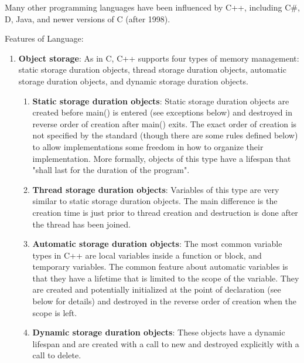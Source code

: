Many other programming languages have been influenced by C++, including C\#, D, Java, and newer versions of C (after 1998).

Features of Language:
\begin{enumerate}
	\item \textbf{Object storage}: As in C, C++ supports four types of memory management: static storage duration objects, thread storage duration objects, automatic storage duration objects, and dynamic storage duration objects.
	\begin{enumerate}
		\item \textbf{Static storage duration objects}: Static storage duration objects are created before main() is entered (see exceptions below) and destroyed in reverse order of creation after main() exits. The exact order of creation is not specified by the standard (though there are some rules defined below) to allow implementations some freedom in how to organize their implementation. More formally, objects of this type have a lifespan that "shall last for the duration of the program".
		\item \textbf{Thread storage duration objects}: Variables of this type are very similar to static storage duration objects. The main difference is the creation time is just prior to thread creation and destruction is done after the thread has been joined.
		\item \textbf{Automatic storage duration objects}: The most common variable types in C++ are local variables inside a function or block, and temporary variables. The common feature about automatic variables is that they have a lifetime that is limited to the scope of the variable. They are created and potentially initialized at the point of declaration (see below for details) and destroyed in the reverse order of creation when the scope is left.
		\item \textbf{Dynamic storage duration objects}: These objects have a dynamic lifespan and are created with a call to new and destroyed explicitly with a call to delete.
	\end{enumerate}

\end{enumerate}
